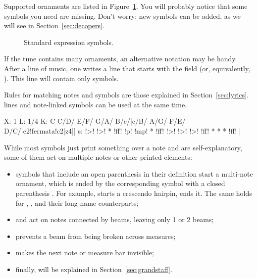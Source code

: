 \documentclass[a4paper,12pt]{book}
\begin{document}
Supported ornaments are listed in Figure~\ref{fig:alldeco}. You will
probably notice that some symbols you need are missing. Don't worry:
new symbols can be added, as we will see in
Section~\ref{sec:decopers}.

\begin{center}
\begin{figure}[htbp]
\caption{Standard expression symbols.}
\label{fig:alldeco}
\end{figure}
\end{center}


If the tune contains many ornaments, an alternative notation may be
handy. After a line of music, one writes a line that starts with the
 field (or, equivalently, ). This line will
contain only symbols.

Rules for matching notes and symbols are those explained in
Section~\ref{sec:lyrics}.  lines and note-linked symbols can
be used at the same time.

\begin{abcsource}
X: 1
L: 1/4
K: C
C/D/ E/F/ G/A/ B/c/|c/B/ A/G/ F/E/ D/C/|e2!fermata!c2|z4|]
s: !>! !>! * !ff! !p! !mp! * !ff! !>! !>! !>! !ff! * * * !ff! |
\end{abcsource}


While most symbols just print something over a note and are
self-explanatory, some of them act on multiple notes or other printed
elements:

\begin{itemize}
  
  \item symbols that include an open parenthesis \car{(} in their
  definition start a multi-note ornament, which is ended by the
  corresponding symbol with a closed parenthesis \car{)}. For example,
  \cmd{!<(!} starts a crescendo hairpin, \cmd{!<)!} ends it. The same
  holds for \cmd{!>(!}, \cmd{!>)!}, and their long-name counterparts;
  
  \item {} and  act on notes connected by
  beams, leaving only 1 or 2 beams;
  
  \item {} prevents a beam from being broken across
  measures;
  
  \item {} makes the next note or measure bar
  invisible;
  
  \item finally,  will be explained in
  Section~\ref{sec:grandstaff}.
  
\end{itemize}
\end{document}
